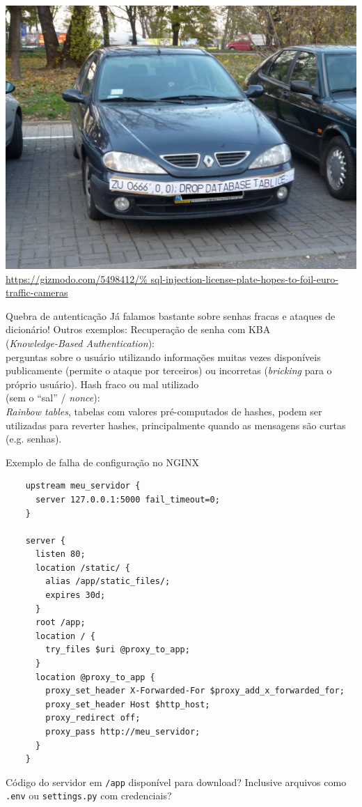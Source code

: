 \documentclass[utf8]{beamer}
\begin{document}
\begin{frame}
  \centering
  \includegraphics[width=\textwidth]{18mpenleoksq8jpg.jpg}
  \fontsize{10pt}{10pt}\selectfont
  \url{https://gizmodo.com/5498412/%
       sql-injection-license-plate-hopes-to-foil-euro-traffic-cameras}
\end{frame}


\begin{frame}{Quebra de autenticação}
  Já falamos bastante sobre senhas fracas e ataques de dicionário!
  \vfill
  Outros exemplos:
  \vfill
  \centering
  Recuperação de senha com KBA \\
  (\emph{Knowledge-Based Authentication}): \\
  perguntas sobre o usuário
  utilizando informações muitas vezes disponíveis publicamente
  (permite o ataque por terceiros)
  ou incorretas (\emph{bricking} para o próprio usuário).
  \vfill
  Hash fraco ou mal utilizado \\ (sem o ``sal'' / \emph{nonce}): \\
  \emph{Rainbow tables}, tabelas com valores pré-computados de hashes,
  podem ser utilizadas para reverter hashes,
  principalmente quando as mensagens são curtas
  (e.g. senhas).
\end{frame}


\begin{frame}[fragile]{Exemplo de falha de configuração no NGINX}
  \begin{verbatim}
    upstream meu_servidor {
      server 127.0.0.1:5000 fail_timeout=0;
    }

    server {
      listen 80;
      location /static/ {
        alias /app/static_files/;
        expires 30d;
      }
      root /app;
      location / {
        try_files $uri @proxy_to_app;
      }
      location @proxy_to_app {
        proxy_set_header X-Forwarded-For $proxy_add_x_forwarded_for;
        proxy_set_header Host $http_host;
        proxy_redirect off;
        proxy_pass http://meu_servidor;
      }
    }
  \end{verbatim}
  Código do servidor em \texttt{/app} disponível para download?
  Inclusive arquivos como \texttt{.env} ou \texttt{settings.py}
  com credenciais?
\end{frame}
\end{document}
